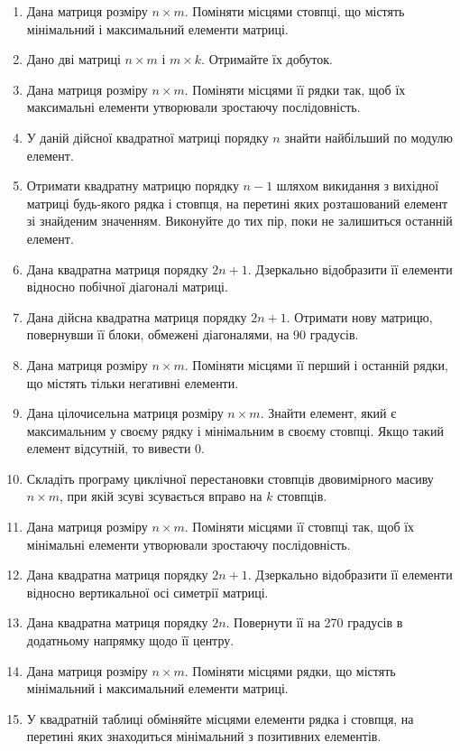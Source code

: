 \documentclass[a5paper,titlepage,openany,twoside,draft]{book_unv}%
\begin{document}
\begin{enumerate}
\item
  Дана матриця розміру $n \times m$. Поміняти місцями стовпці, що містять
  мінімальний і максимальний елементи матриці.
\item
  Дано дві матриці $n \times m$ і $m \times k$. Отримайте їх добуток.
\item
  Дана матриця розміру $n \times m$. Поміняти місцями її рядки так, щоб їх
  максимальні елементи утворювали зростаючу послідовність.
\item
  У даній дійсної квадратної матриці порядку $n$ знайти найбільший по
  модулю елемент.
\item
  Отримати квадратну матрицю порядку $n - 1$ шляхом викидання з вихідної
  матриці будь-якого рядка і стовпця, на перетині яких розташований
  елемент зі знайденим значенням. Виконуйте до тих пір, поки не
  залишиться останній елемент.
\item
  Дана квадратна матриця порядку $2n + 1$. Дзеркально відобразити її
  елементи відносно побічної діагоналі матриці.
\item
  Дана дійсна квадратна матриця порядку $2n + 1$. Отримати нову матрицю,
  повернувши її блоки, обмежені діагоналями, на 90 градусів.
\item
  Дана матриця розміру $n \times m$. Поміняти місцями її перший і останній
  рядки, що містять тільки негативні елементи.
\item
  Дана цілочисельна матриця розміру $n \times m$. Знайти елемент, який є
  максимальним у своєму рядку і мінімальним в своєму стовпці. Якщо такий
  елемент відсутній, то вивести 0.
\item
  Складіть програму циклічної перестановки стовпців двовимірного масиву
  $n \times m$, при якій зсуві зсувається вправо на $k$ стовпців.
\item
  Дана матриця розміру $n \times m$. Поміняти місцями її стовпці так, щоб їх
  мінімальні елементи утворювали зростаючу послідовність.
\item
  Дана квадратна матриця порядку $2n + 1$. Дзеркально відобразити її
  елементи відносно вертикальної осі симетрії матриці.
\item
  Дана квадратна матриця порядку $2n$. Повернути її на 270 градусів в
  додатньому напрямку щодо її центру.
\item
  Дана матриця розміру $n \times m$. Поміняти місцями рядки, що містять
  мінімальний і максимальний елементи матриці.
\item
  У квадратній таблиці обміняйте місцями елементи рядка і стовпця, на
  перетині яких знаходиться мінімальний з позитивних елементів.

\end{enumerate}
\end{document}

